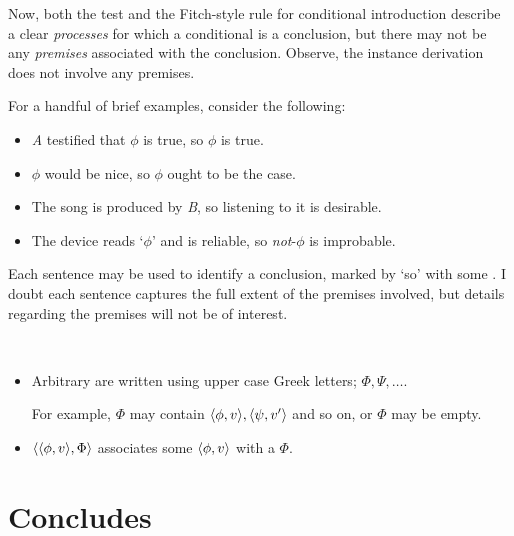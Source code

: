 \begin{note}
{    Now, both the \citeauthor{Ramsey:1929tf} test and the Fitch-style rule for conditional introduction describe a clear \emph{processes} for which a conditional is a conclusion, but there may not be any \emph{premises} associated with the conclusion.
    Observe, the instance derivation does not involve any premises.
  }


  For a handful of brief examples, consider the following:

  \begin{itemize}[noitemsep]
  \item
    \emph{A} testified that \(\phi\) is true, so \(\phi\) is true.
  \item
    \(\phi\) would be nice, so \(\phi\) ought to be the case.
  \item
    The song is produced by \emph{B}, so listening to it is desirable.
  \item
    The device reads `\(\phi\)' and is reliable, so \emph{not}-\(\phi\) is improbable.
  \end{itemize}

  Each sentence may be used to identify a conclusion, marked by `so' with some \pool{}.
  I doubt each sentence captures the full extent of the premises involved, but details regarding the premises will not be of interest.
\end{note}

\begin{note}
  \begin{notation}[\pool{3}]
    \mbox{ }
    \vspace{-\baselineskip}
    \begin{itemize}[leftmargin=*]
    \item
      Arbitrary  are written using upper case Greek letters; \(\Phi, \Psi, \dots\).

      For example, \(\Phi\) may contain \(\langle \phi, v \rangle, \langle \psi, v' \rangle\) and so on, or \(\Phi\) may be empty.

    \item
      \(\langle \langle \phi, v \rangle, \Phi \rangle\) associates some \evalN{} \(\langle \phi, v \rangle\) with a \pool{} \(\Phi\).
    \end{itemize}
  \end{notation}
\end{note}



\section{Concludes}
\label{cha:clar:sec:Concls}

